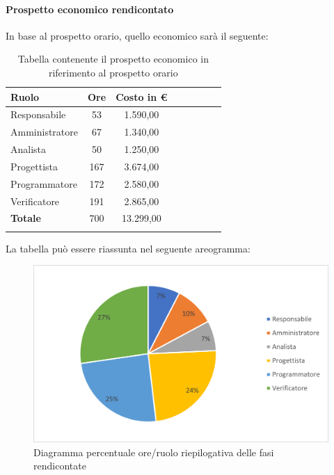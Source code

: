 \paragraph{Prospetto economico rendicontato}
In base al prospetto orario, quello economico sarà il seguente:

\begin{longtable}{|l|c|c|c|c|c|c|c|}
	\hline
	\rowcolor{lighter-grayer}
	\textbf{Ruolo}  & \textbf{Ore} & \textbf{Costo in €} \\
	\hline
	\endfirsthead

	\hline
	Responsabile    & 53           & 1.590,00            \\
	\hline
	\hline
	Amministratore  & 67           & 1.340,00            \\
	\hline
	\hline
	Analista        & 50           & 1.250,00            \\
	\hline
	\hline
	Progettista     & 167          & 3.674,00            \\
	\hline
	\hline
	Programmatore   & 172          & 2.580,00            \\
	\hline
	\hline
	Verificatore    & 191          & 2.865,00            \\
	\hline
	\hline
	\textbf{Totale} & 700          & 13.299,00           \\
	\hline
	\rowcolor{white}
	\caption{Tabella contenente il prospetto economico in riferimento al prospetto orario}
\end{longtable}
\pagebreak

La tabella può essere riassunta nel seguente areogramma:
\begin{figure}[H]
	\centering
	\includegraphics[width=0.8\linewidth]{res/images/preventivo/totrend2.png}
	\caption{Diagramma percentuale ore/ruolo riepilogativa delle fasi rendicontate}
	\label{fig:diagramma costi ruolo riepilogativa delle fasi rendicontate}
\end{figure}

